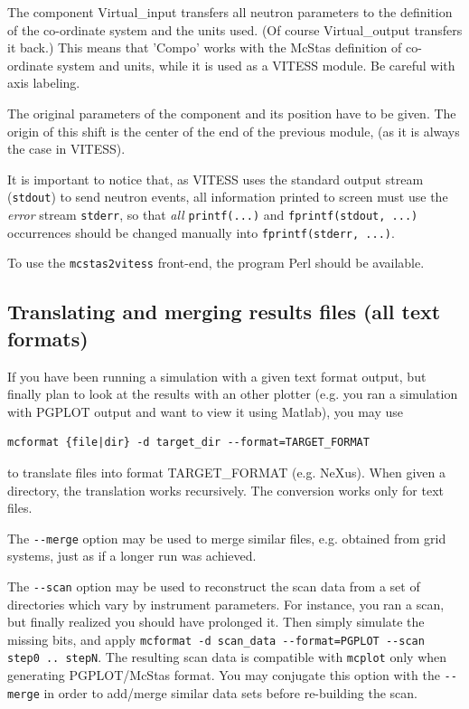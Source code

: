The component Virtual\_input transfers all neutron parameters to the \MCS
definition of the co-ordinate system and the units used. (Of course
Virtual\_output transfers it back.) This means that 'Compo' works with the
McStas definition of co-ordinate system and units, while it is used as a VITESS
module. Be careful with axis labeling.

The original parameters of the component and its position have to be given. The
origin of this shift is the center of the end of the previous module, (as it is
always the case in VITESS).

It is important to notice that, as VITESS uses the standard output stream
(\verb+stdout+) to send neutron events, all information printed to screen must
use the \emph{error} stream \verb+stderr+, so that \emph{all} \verb+printf(...)+
and \verb+fprintf(stdout, ...)+ occurrences should be changed manually into
\verb+fprintf(stderr, ...)+.

To use the \verb+mcstas2vitess+ front-end, the program Perl should be available.

\subsection{Translating and merging \MCS results files (all text formats)}
\label{s:mcformat}

If you have been running a \MCS simulation with a given text format output, but
finally plan to look at the results with an other plotter (e.g. you ran a
simulation with PGPLOT output and want to view it using Matlab), you may use
\begin{lstlisting}
mcformat {file|dir} -d target_dir --format=TARGET_FORMAT
\end{lstlisting}
to translate files into format TARGET\_FORMAT (e.g. NeXus). When given a directory, the
translation works recursively. The conversion works only for text files.

The \verb+--merge+ option may be used to merge similar files, e.g. obtained from
grid systems, just as if a longer run was achieved.

The \verb+--scan+ option may be used to reconstruct the scan data from a set of
directories which vary by instrument parameters. For instance, you ran a scan,
but finally realized you should have prolonged it. Then simply simulate the
missing bits, and apply
\verb+mcformat -d scan_data --format=PGPLOT --scan step0 .. stepN+. The
resulting scan data is compatible with \verb+mcplot+ only when generating
PGPLOT/McStas format.
You may conjugate this option with the
\verb+--merge+ in order to add/merge similar data sets before re-building the
scan.

